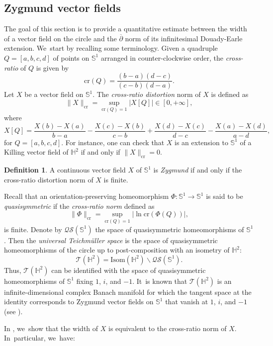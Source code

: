 \documentclass[JEP,XML,SOM,Unicode,NoEqCountersInSection, NoFloatCountersInSection,published]{cedram}
\theoremstyle{plain}
\theoremstyle{definition}
\newtheorem{defi}[cor]{Definition}
\begin{document}
\subsection{Zygmund vector fields}
The goal of this section is to provide a quantitative estimate between the width of a vector field on the circle and the $\overline{\partial}$ norm of its infinitesimal Douady-Earle extension. We~start by recalling some terminology. Given a quadruple $Q=[a,b,c,d]$ of points on $\mathbb{S}^1$ arranged in counter-clockwise order, the \emph{cross-ratio} of $Q$ is given by
\[
\mathrm{cr}(Q)=\frac{ (b-a)(d-c) }{ (c-b)(d-a) }.
\]
Let $X$ be a vector field on $\mathbb{S}^1$. The \emph{cross-ratio distortion} norm of $X$ is defined as
\[
\lVert X \rVert_\mathrm{cr}=\sup_{\mathrm{cr}(Q)=1}\vert X[Q]\vert \in[0,+\infty],
\]
where
\[
X[Q]=\frac{X(b)-X(a)}{b-a}-\frac{X(c)-X(b)}{c-b}+\frac{X(d)-X(c)}{d-c}-\frac{X(a)-X(d)}{a-d},
\]
for $Q=[a,b,c,d]$. For instance, one can check that $X$ is an extension to $\mathbb{S}^1$ of a Killing vector field of $\mathbb{H}^2$ if and only if $\lVert X\rVert_\mathrm{cr}=0$.

\begin{defi}
A continuous vector field $X$ of $\mathbb{S}^1$ is \emph{Zygmund} if and only if the cross-ratio distortion norm of $X$ is finite.
\end{defi}
Recall that an orientation-preserving homeomorphism $\Phi:\mathbb{S}^1\to\mathbb{S}^1$ is said to be \emph{quasisymmetric} if the \emph{cross-ratio norm} defined as
\[
\lVert \Phi \rVert_\mathrm{cr}=\sup_{\mathrm{cr}(Q)=1} \vert{\ln\mathrm{cr}\left(\Phi(Q)\right)} \vert ,
\]
is finite. Denote by $\mathcal{QS}(\mathbb{S}^1)$ the space of quasisymmetric homeomorphisms of $\mathbb{S}^1$. Then the \emph{universal Teichmüller space} is the space of quasisymmetric homeomorphisms of the circle up to post-composition with an isometry of $\mathbb{H}^2$:
\[
\mathcal{T}(\mathbb{H}^2)=\mathrm{Isom}(\mathbb{H}^2)\backslash \mathcal{QS}(\mathbb{S}^1).
\]
Thus, $\mathcal{T}(\mathbb{H}^2)$ can be identified with the space of quasisymmetric homeomorphisms of $\mathbb{S}^1$ fixing $1$, $i$, and $-1$. It~is known that $\mathcal{T}(\mathbb{H}^2)$ is an infinite-dimensional complex Banach manifold for which the tangent space at the identity corresponds to Zygmund vector fields on $\mathbb{S}^1$ that vanish at $1$, $i$, and $-1$ (see \cite{Gardiner1999QuasiconformalTT}).

In \cite[Th.\,1.3]{diaf2023Infearth}, we~show that the width of $X$ is equivalent to the cross-ratio norm of $X$. In~particular, we~have:
\end{document}
